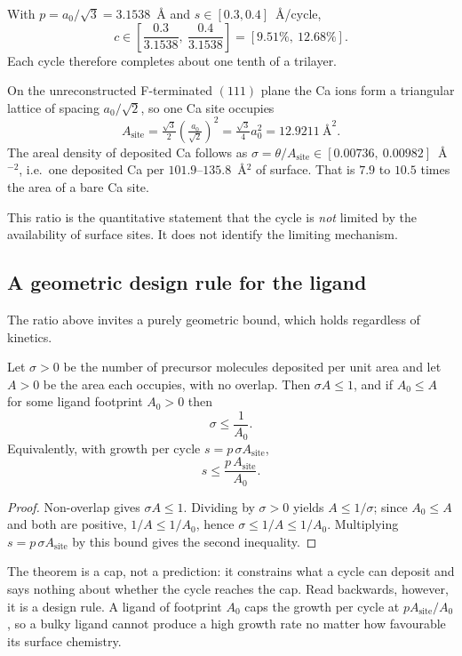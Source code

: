 With $p=a_0/\sqrt3=3.1538$~\AA{} and $s\in[0.3,0.4]$~\AA/cycle,
\[
c \in \left[\frac{0.3}{3.1538},\ \frac{0.4}{3.1538}\right]
  = [9.51\%,\ 12.68\%].
\]
Each cycle therefore completes about one tenth of a trilayer.

On the unreconstructed F-terminated $(111)$ plane the Ca ions form a triangular
lattice of spacing $a_0/\sqrt2$, so one Ca site occupies
\[
A_{\mathrm{site}} = \tfrac{\sqrt3}{2}\left(\tfrac{a_0}{\sqrt2}\right)^2
= \tfrac{\sqrt3}{4}a_0^2 = 12.9211\ \text{\AA}^2 .
\]
The areal density of deposited Ca follows as
$\sigma = \theta/A_{\mathrm{site}} \in [0.00736,\ 0.00982]$~\AA$^{-2}$, i.e.\ one
deposited Ca per $101.9$--$135.8$~\AA$^2$ of surface. That is $7.9$ to $10.5$
times the area of a bare Ca site.

\begin{remark}
This ratio is the quantitative statement that the cycle is \emph{not} limited
by the availability of surface sites. It does not identify the limiting
mechanism.
\end{remark}

\subsection{A geometric design rule for the ligand}

The ratio above invites a purely geometric bound, which holds regardless of
kinetics.

\begin{theorem}
\label{thm:footprint}
Let $\sigma>0$ be the number of precursor molecules deposited per unit area and
let $A>0$ be the area each occupies, with no overlap. Then $\sigma A\le1$, and
if $A_0\le A$ for some ligand footprint $A_0>0$ then
\[
\sigma \le \frac{1}{A_0}.
\]
Equivalently, with growth per cycle $s = p\,\sigma A_{\mathrm{site}}$,
\[
s \le \frac{p\,A_{\mathrm{site}}}{A_0}.
\]
\end{theorem}
\begin{proof}
Non-overlap gives $\sigma A\le1$. Dividing by $\sigma>0$ yields
$A\le1/\sigma$; since $A_0\le A$ and both are positive,
$1/A\le1/A_0$, hence $\sigma\le1/A\le1/A_0$. Multiplying
$s=p\,\sigma A_{\mathrm{site}}$ by this bound gives the second inequality.
\end{proof}

The theorem is a cap, not a prediction: it constrains what a cycle can deposit
and says nothing about whether the cycle reaches the cap. Read backwards,
however, it is a design rule. A ligand of footprint $A_0$ caps the growth per
cycle at $pA_{\mathrm{site}}/A_0$, so a bulky ligand cannot produce a high
growth rate no matter how favourable its surface chemistry.

